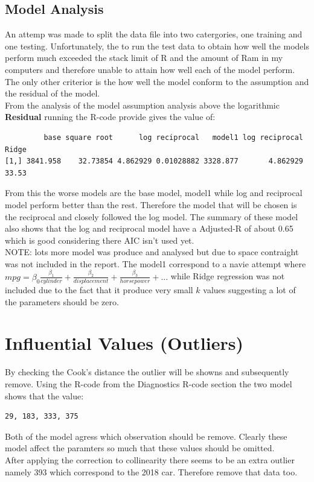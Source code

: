 \documentclass[11pt]{article} %
\begin{document}
\subsection{Model Analysis}
An attemp was made to split the data file into two catergories, one training and one testing. Unfortunately, the to run the test data to obtain how well the models perform much exceeded the stack limit of R and the amount of Ram in my computers and therefore unable to attain how well each of the model perform. The only other criterior is the how well the model conform to the assumption and the residual of the model.\\
From the analysis of the model assumption analysis above the logarithmic 
\textbf{Residual}
running the R-code provide gives the value of:
\begin{lstlisting}
         base square root      log reciprocal   model1 log reciprocal Ridge
[1,] 3841.958    32.73854 4.862929 0.01028882 3328.877       4.862929 33.53
\end{lstlisting}
From this the worse models are the base model, model1 while log and reciprocal model perform better than the rest. Therefore the model that will be chosen is the reciprocal and closely followed the log model. The summary of these model also shows that the log and reciprocal model have a Adjusted-R of about 0.65 which is good considering there AIC isn't used yet.\\
NOTE: lots more model was produce and analysed but due to space contraight was not included in the report. The model1 correspond to a navie attempt where $mpg =\beta_0 \frac{\beta_1}{cylinder}+\frac{\beta_2}{displacement}+\frac{\beta_3}{horsepower}+...$ while Ridge regression was not included due to the fact that it produce very small $k$ values suggesting a lot of the parameters should be zero.
\section{Influential Values (Outliers)}
By checking the Cook's distance the outlier will be showns and subsequently remove. Using the R-code from the Diagnostics R-code section the two model shows that the value:
\begin{lstlisting}
29, 183, 333, 375 
\end{lstlisting}
Both of the model agress which observation should be remove.
Clearly these model affect the paramters so much that these values should be omitted.\\
After applying the correction to collinearity there seems to be an extra outlier namely 393 which correspond to the 2018 car. Therefore remove that data too.
\end{document}
